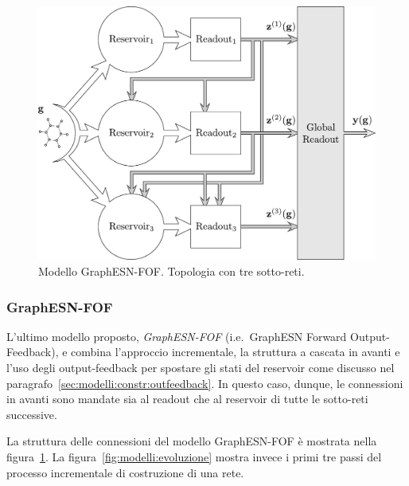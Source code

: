 \begin{figure}[p]
\centering
\includegraphics[width=0.8\columnwidth]{img/Modello-FOF}
\medskip
\caption[GraphESN-FOF.]{Modello GraphESN-FOF. Topologia con tre sotto-reti.}
\label{fig:modelli:fof}
\end{figure}

\subsubsection*{GraphESN-FOF}
L'ultimo modello proposto, \emph{GraphESN-FOF} (i.e.\ Graph\-ESN Forward Output-Feedback), e combina l'approccio incrementale, la struttura a cascata in avanti e l'uso degli output-feedback per spostare gli stati del reservoir come discusso nel paragrafo~\ref{sec:modelli:constr:outfeedback}. In questo caso, dunque, le connessioni in avanti sono mandate sia al readout che al reservoir di tutte le sotto-reti successive.

La struttura delle connessioni del modello GraphESN-FOF è mostrata nella figura~\ref{fig:modelli:fof}. La figura~\vref{fig:modelli:evoluzione} mostra invece i primi tre passi del processo incrementale di costruzione di una rete.


